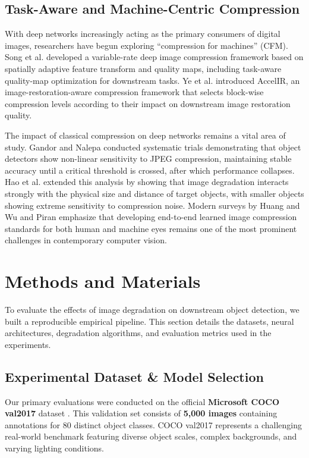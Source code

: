 \documentclass[12pt, a4paper]{article}
\begin{document}
\subsection{Task-Aware and Machine-Centric Compression}
With deep networks increasingly acting as the primary consumers of digital images, researchers have begun exploring ``compression for machines'' (CFM). Song et al. \cite{song2021} developed a variable-rate deep image compression framework based on spatially adaptive feature transform and quality maps, including task-aware quality-map optimization for downstream tasks. Ye et al. \cite{ye2023} introduced AccelIR, an image-restoration-aware compression framework that selects block-wise compression levels according to their impact on downstream image restoration quality.

The impact of classical compression on deep networks remains a vital area of study. Gandor and Nalepa \cite{gandor2022} conducted systematic trials demonstrating that object detectors show non-linear sensitivity to JPEG compression, maintaining stable accuracy until a critical threshold is crossed, after which performance collapses. Hao et al. \cite{hao2022} extended this analysis by showing that image degradation interacts strongly with the physical size and distance of target objects, with smaller objects showing extreme sensitivity to compression noise. Modern surveys by Huang and Wu \cite{huang2024} and Piran \cite{piran2022} emphasize that developing end-to-end learned image compression standards for both human and machine eyes remains one of the most prominent challenges in contemporary computer vision.

\section{Methods and Materials}
To evaluate the effects of image degradation on downstream object detection, we built a reproducible empirical pipeline. This section details the datasets, neural architectures, degradation algorithms, and evaluation metrics used in the experiments.

\subsection{Experimental Dataset \& Model Selection}
Our primary evaluations were conducted on the official \textbf{Microsoft COCO val2017} dataset \cite{lin2014}. This validation set consists of \textbf{5,000 images} containing annotations for 80 distinct object classes. COCO val2017 represents a challenging real-world benchmark featuring diverse object scales, complex backgrounds, and varying lighting conditions.
\end{document}
